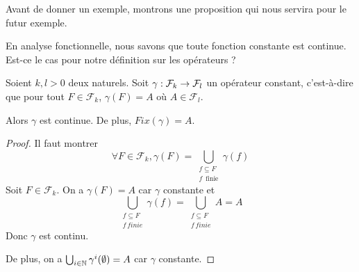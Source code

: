 Avant de donner un exemple, montrons une proposition qui nous servira pour le
futur exemple.

En analyse fonctionnelle, nous savons que toute fonction constante est
continue. Est-ce le cas pour notre définition sur les opérateurs ?

\begin{proposition}
	Soient $k, l > 0$ deux naturels.
	Soit $\gamma : \mathcal{F}_{k} \rightarrow \mathcal{F}_{l}$ un opérateur
	constant, c'est-à-dire que pour tout $F \in \mathcal{F}_{k}$, $\gamma(F) = A$
	où $A \in \mathcal{F}_{l}$.

	Alors $\gamma$ est continue. De plus, $Fix(\gamma) = A$.
\end{proposition}

\ifdefined\outputproof
\begin{proof}
	Il faut montrer
	\begin{equation}
		\forall F \in \mathcal{F}_{k}, \gamma(F) = \displaystyle \bigcup_{\substack{f \subseteq
			F \\ f \, \text{ finie}}} \gamma(f)
	\end{equation}
	Soit $F \in \mathcal{F}_{k}$.
	On a $\gamma(F) = A$ car $\gamma$ constante et
	\begin{equation}
		\bigcup_{\substack{f \subseteq F \\ f \, finie}} \gamma(f) =
		\bigcup_{\substack{f \subseteq F \\ f \, finie}} A = A
	\end{equation}
	Donc $\gamma$ est continu.

	De plus, on a $\bigcup_{i \in \mathbb{N}} \gamma^{i}(\emptyset) = A$ car
	$\gamma$ constante.
\end{proof}
\fi







